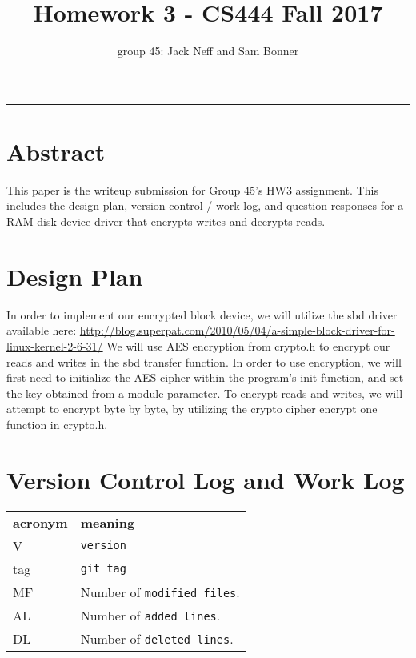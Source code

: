 \documentclass[letterpaper,10pt,fleqn]{article}
\title{Homework 3 - CS444 Fall 2017}
\author{group 45: Jack Neff and Sam Bonner}
\begin{document}
\maketitle
\hrule

\section*{Abstract}

This paper is the writeup submission for Group 45's HW3 assignment. This includes the design plan, version control / work log, and question responses for a RAM disk device driver that encrypts writes and decrypts reads.

\pagebreak
\section*{Design Plan}

In order to implement our encrypted block device, we will utilize the sbd driver available here: \newline
\url{http://blog.superpat.com/2010/05/04/a-simple-block-driver-for-linux-kernel-2-6-31/}
We will use AES encryption from crypto.h to encrypt our reads and writes in the sbd transfer function. In order to use encryption, we will first need to initialize the AES cipher within the program's init function, and set the key obtained from a module parameter. To encrypt reads and writes, we will attempt to encrypt byte by byte, by utilizing the crypto cipher encrypt one function in crypto.h.

\section*{Version Control Log and Work Log}
 
 \begin{tabular}{lp{8cm}}
  \label{tabular:legend:git-log}
  \textbf{acronym} & \textbf{meaning} \\
  V & \texttt{version} \\
  tag & \texttt{git tag} \\
  MF & Number of \texttt{modified files}. \\
  AL & Number of \texttt{added lines}. \\
  DL & Number of \texttt{deleted lines}. \\
\end{tabular}

\bigskip
\end{document}

